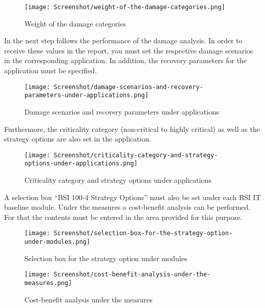 \documentclass[a4paper,10pt]{book}
\begin{document}
\begin{figure}[!htb]
  \centering
  \texttt{[image: Screenshot/weight-of-the-damage-categories.png]}
  \caption{Weight of the damage categories}
  \label{fig:weight-of-the-damage-categories}
\end{figure}

In the next step follows the performance of the damage analysis. In order to
receive these values in the report, you must set the respective damage scenarios
in the corresponding application. In addition, the recovery parameters for the
application must be specified.

\begin{figure}[!htb]
  \centering
  \texttt{[image: Screenshot/damage-scenarios-and-recovery-parameters-under-applications.png]}
  \caption{Damage scenarios and recovery parameters under applications}
  \label{fig:damage-scenarios-and-recovery-parameters-under-applications}
\end{figure}

Furthermore, the criticality category (non-critical to highly critical) as well
as the strategy options are also set in the application.

\begin{figure}[!htb]
  \centering
  \texttt{[image: Screenshot/criticality-category-and-strategy-options-under-applications.png]}
  \caption{Criticality category and strategy options under applications}
  \label{fig:criticality-category-and-strategy-options-under-applications}
\end{figure}

A selection box ``BSI 100-4 Strategy Options'' must also be set under each BSI
IT baseline module. Under the measures a cost-benefit analysis can be performed.
For that the contents must be entered in the area provided for this purpose.

\begin{figure}[!htb]
  \centering
  \texttt{[image: Screenshot/selection-box-for-the-strategy-option-under-modules.png]}
  \caption{Selection box for the strategy option under modules}
  \label{fig:selection-box-for-the-strategy-option-under-modules}
\end{figure}

\begin{figure}[!htb]
  \centering
  \texttt{[image: Screenshot/cost-benefit-analysis-under-the-measures.png]}
  \caption{Cost-benefit analysis under the measures}
  \label{fig:cost-benefit-analysis-under-the-measures}
\end{figure}
\end{document}
